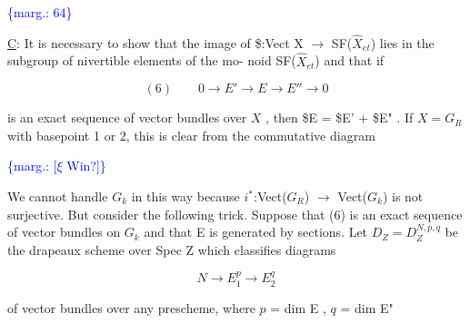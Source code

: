 \documentclass[11pt]{article}
\newcommand{\scanpage}[1]{\par\bigskip\noindent{\small\sffamily[scan #1]}\par}
\newcommand{\mspage}[1]{{\small\sffamily[p.\,#1]}}
\newcommand{\hand}[1]{\textcolor{blue}{#1}}
\newcommand{\margin}[1]{\textcolor{blue}{\{\textsf{marg.:} #1\}}}
\newcommand{\uline}[1]{\underline{#1}}
\newcommand{\unsure}[1]{[#1?]}
\newenvironment{diagramblock}{\par\begin{center}}{\end{center}\par}
\begin{document}
\margin{64}

\clearpage
\scanpage{162-5/65}
\mspage{- 9 -}

\uline{C}: It is necessary to show that the image of \$:Vect X $\rightarrow$
SF($\hat{X}_{et}$) lies in the subgroup of nivertible elements of the mo-%
noid SF($\hat{X}_{et}$) and that if

\[ (6) \qquad 0 \rightarrow E' \rightarrow E \rightarrow E'' \rightarrow 0 \]

is an exact sequence of vector bundles over $X$ , then \$E =
\$E' + \$E" . If $X = G_R$ with basepoint 1 or 2, this is clear from
the commutative diagram

\begin{diagramblock}\end{diagramblock}
\margin{\unsure{$\xi$ Win}}

We cannot handle $G_k$ in this way because $i^*$:Vect($G_R$) $\rightarrow$ Vect($G_k$)
is not surjective. But consider the following trick. Suppose
that (6) is an exact sequence of vector bundles on $G_k$ and that
E is generated by sections. Let $D_Z = D_Z^{N,p,q}$ be the drapeaux
scheme over Spec Z which classifies diagrams

\[ N \rightarrow E_1^p \rightarrow E_2^q \]

of vector bundles over any prescheme, where $p$ = dim E , $q$ = dim E"

\mspage{\hand{65}}

\clearpage
\scanpage{162-5/66}
\mspage{- 10 -}
\end{document}
